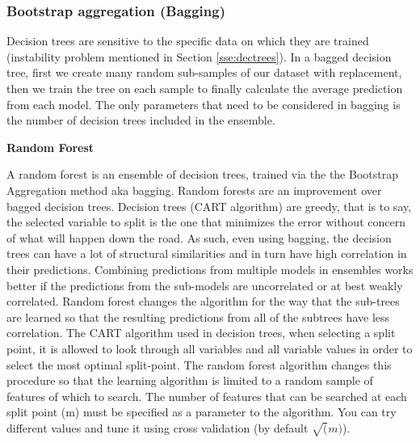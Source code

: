 \documentclass[11pt]{article}
\theoremstyle{definition}
\theoremstyle{remark}
\begin{document}
\subsubsection{Bootstrap aggregation (Bagging)}
\label{sse:resrf}

Decision trees are sensitive to the specific data on which they are trained (instability problem mentioned in Section \ref{sse:dectrees}). In a bagged decision tree, first we create many random sub-samples of our dataset with replacement, then we train the tree on each sample to finally calculate the average prediction from each model. 
The only parameters that need to be considered in bagging is the number of decision trees included in the ensemble.

\textbf{Random Forest}


A random forest is an ensemble of decision trees, trained via the the Bootstrap Aggregation method aka bagging. Random forests are an improvement over bagged decision trees. Decision trees (CART algorithm) are greedy, that is to say, the selected variable to split is the one that minimizes the error without concern of what will happen down the road. As such, even using bagging, the decision trees can have a lot of structural similarities and in turn have high correlation in their predictions. Combining predictions from multiple models in ensembles works better if the predictions from the sub-models are uncorrelated or at best weakly correlated.
Random forest changes the algorithm for the way that the sub-trees are learned so that the resulting predictions from all of the subtrees have less correlation. The CART algorithm used in decision trees, when selecting a split point, it is allowed to look through all variables and all variable values in order to select the most optimal split-point. The random forest algorithm changes this procedure so that the learning algorithm is limited to a random sample of features of which to search. The number of features that can be searched at each split point (m) must be specified as a parameter to the algorithm. You can try different values and tune it using cross validation (by default $\sqrt(m)$).
\end{document}
